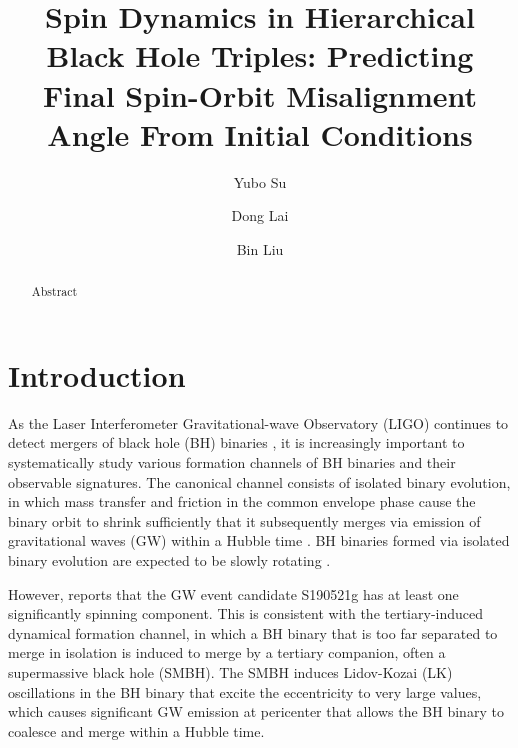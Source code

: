 \documentclass[
        twocolumn,
        twocolappendix
    ]{aastex63}
\begin{document}
\title{Spin Dynamics in Hierarchical Black Hole Triples: Predicting Final
Spin-Orbit Misalignment Angle From Initial Conditions}


\author[0000-0001-8283-3425]{Yubo Su}%

\author[0000-0002-1934-6250]{Dong Lai}%

\author[0000-0002-0643-8295]{Bin Liu}%

\begin{abstract}
    Abstract
\end{abstract}


\section{Introduction}\label{s:intro}

As the Laser Interferometer Gravitational-wave Observatory (LIGO) continues to
detect mergers of black hole (BH) binaries
\citep[e.g.][]{LIGOScientific:2020stg, Abbott:2017gyy, Abbott:2017oio,
Abbott:2017vtc, Abbott:2016nmj, TheLIGOScientific:2016pea, Abbott:2016blz}, it
is increasingly important to systematically study various formation channels of
BH binaries and their observable signatures. The canonical channel consists of
isolated binary evolution, in which mass transfer and friction in the common
envelope phase cause the binary orbit to shrink sufficiently that it
subsequently merges via emission of gravitational waves (GW) within a Hubble
time \citep[e.g.][]{dominik2012double}. BH binaries formed via isolated binary
evolution are expected to be slowly rotating \citep{fuller2019most}.

However, \citep{S190521g} reports that the GW event candidate S190521g has at
least one significantly spinning component. This is consistent with the
tertiary-induced dynamical formation channel, in which a BH binary that is too
far separated to merge in isolation is induced to merge by a tertiary companion,
often a supermassive black hole (SMBH). The SMBH induces Lidov-Kozai (LK)
oscillations in the BH binary that excite the eccentricity to very large values,
which causes significant GW emission at pericenter that allows the BH binary to
coalesce and merge within a Hubble time.
\end{document}
